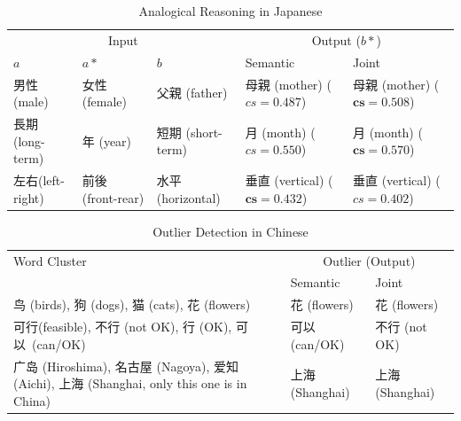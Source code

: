 \begin{table}[h!]
    \centering
    \begin{CJK}{UTF8}{ipxm}
        \begin{tabularx}{\textwidth}{lllbb}
            \toprule
            \multicolumn{3}{c}{Input} & \multicolumn{2}{c}{Output ($b*$)} \\
            \cmidrule(lr){1-3} \cmidrule(lr){4-5} $a$ & $a*$ & $b$ & Semantic & Joint \\\midrule
            \vspace{0.2cm} 男性(male) & 女性 (female) & 父親 (father) & \mbox{母親} (mother) \newline ($cs=0.487$) & \mbox{母親} (mother) \newline ($\bm{cs=0.508}$) \\
            \vspace{0.2cm} 長期 (long-term) & 年 (year) & 短期 (short-term) & 月 (month) \newline ($cs=0.550$) & 月 (month) \newline ($\bm{cs=0.570}$) \\
            左右(left-right) & 前後 (front-rear) & 水平 (horizontal) & \mbox{垂直} (\mbox{vertical}) \newline ($\bm{cs=0.432}$) & \mbox{垂直} (\mbox{vertical}) \newline ($cs=0.402$) \\\bottomrule
        \end{tabularx}
    \end{CJK}
    \caption{Analogical Reasoning in Japanese}
    \label{tab:analysis_analogy2}
\end{table}

\begin{table}[h!]
    \centering
    \begin{CJK}{UTF8}{gbsn}
        \begin{tabularx}{\textwidth}{bll}
            \toprule
            \multirow{2.5}{*}{Word Cluster} & \multicolumn{2}{c}{Outlier (Output)} \\
            \cmidrule(lr){2-3} {} & Semantic & Joint \\\midrule

            鸟 (birds), 狗 (dogs), 猫 (cats), 花 (flowers) & \vspace{0.2cm} 花 (flowers) & 花 (flowers) \\

            可行(feasible), 不行 (not OK), 行 (OK), \mbox{可以}~(can/OK) & \vspace{0.2cm} 可以 (can/OK) & 不行 (not OK) \\

            \mbox{广岛} (Hiroshima), \mbox{名古屋} (Nagoya), \mbox{爱知}(Aichi), 上海 (Shanghai, only this one is in China) & 上海 (Shanghai) & 上海 (Shanghai)\\\bottomrule
        \end{tabularx}
    \end{CJK}
    \caption{Outlier Detection in Chinese}
    \label{tab:analysis_outlier1}
\end{table}

